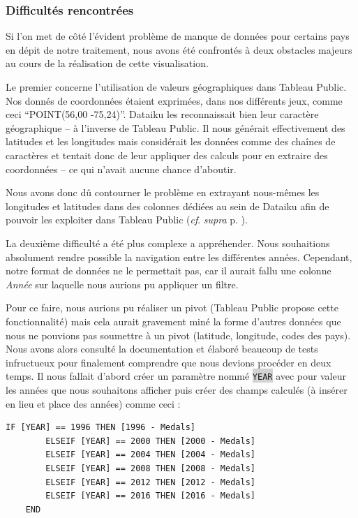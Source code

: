 \documentclass[hidelinks, 12pt]{report}
\newcommand{\code}[1]{\colorbox{LightGray}{\texttt{#1}}}
\begin{document}
\subsubsection{Difficultés rencontrées}

Si l'on met de côté l'évident problème de manque de données pour certains pays en dépit de notre traitement, nous avons été confrontés à deux obstacles majeurs au cours de la réalisation de cette visualisation.

Le premier concerne l'utilisation de valeurs géographiques dans Tableau Public. Nos donnés de coordonnées étaient exprimées, dans nos différents jeux, comme ceci \enquote{POINT(56,00 -75,24)}. Dataiku les reconnaissait bien leur caractère géographique -- à l'inverse de Tableau Public. Il nous générait effectivement des latitudes et les longitudes mais considérait les données comme des chaînes de caractères et tentait donc de leur appliquer des calculs pour en extraire des coordonnées -- ce qui n'avait aucune chance d'aboutir.

Nous avons donc dû contourner le problème en extrayant nous-mêmes les longitudes et latitudes dans des colonnes dédiées au sein de Dataiku afin de pouvoir les exploiter dans Tableau Public (\textit{cf}. \textit{supra} p. \pageref{casse}).

La deuxième difficulté a été plus complexe a appréhender. Nous souhaitions absolument rendre possible la navigation entre les différentes années. Cependant, notre format de données ne le permettait pas, car il aurait fallu une colonne \textit{Année} sur laquelle nous aurions pu appliquer un filtre.

Pour ce faire, nous aurions pu réaliser un pivot (Tableau Public propose cette fonctionnalité) mais cela aurait gravement miné la forme d'autres données que nous ne pouvions pas soumettre à un pivot (latitude, longitude, codes des pays). Nous avons alors consulté la documentation et élaboré beaucoup de tests infructueux pour finalement comprendre que nous devions procéder en deux temps. Il nous fallait d'abord créer un paramètre nommé \code{YEAR} avec pour valeur les années que nous souhaitons afficher puis créer des champs calculés (à insérer en lieu et place des années) comme ceci :

\begin{lstlisting}[language=tableau]
	IF [YEAR] == 1996 THEN [1996 - Medals]
		ELSEIF [YEAR] == 2000 THEN [2000 - Medals]
		ELSEIF [YEAR] == 2004 THEN [2004 - Medals]
		ELSEIF [YEAR] == 2008 THEN [2008 - Medals]
		ELSEIF [YEAR] == 2012 THEN [2012 - Medals]
		ELSEIF [YEAR] == 2016 THEN [2016 - Medals]
	END
\end{lstlisting}
\end{document}
